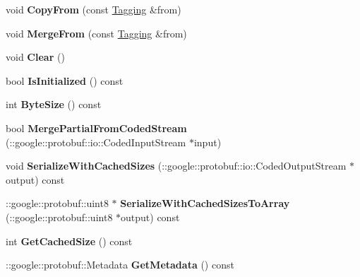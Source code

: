 \begin{DoxyCompactItemize}
\item 
\hypertarget{classTagging_ab2271da80aa840cfa9b2de493b3eeb1f}{
void {\bfseries CopyFrom} (const \hyperlink{classTagging}{Tagging} \&from)}
\label{classTagging_ab2271da80aa840cfa9b2de493b3eeb1f}

\item 
\hypertarget{classTagging_a13d8b75c40ac5f295bc61a2f3f94c3b0}{
void {\bfseries MergeFrom} (const \hyperlink{classTagging}{Tagging} \&from)}
\label{classTagging_a13d8b75c40ac5f295bc61a2f3f94c3b0}

\item 
\hypertarget{classTagging_a43f8e265b50703f56a295083d3aa9676}{
void {\bfseries Clear} ()}
\label{classTagging_a43f8e265b50703f56a295083d3aa9676}

\item 
\hypertarget{classTagging_ab5617848ff03416f1ab4d98e2bfdef26}{
bool {\bfseries IsInitialized} () const }
\label{classTagging_ab5617848ff03416f1ab4d98e2bfdef26}

\item 
\hypertarget{classTagging_a6c2f74cb255bb4913fd279c6f3254729}{
int {\bfseries ByteSize} () const }
\label{classTagging_a6c2f74cb255bb4913fd279c6f3254729}

\item 
\hypertarget{classTagging_a1c8cf78b674f62c201f31e2b6ad721f2}{
bool {\bfseries MergePartialFromCodedStream} (::google::protobuf::io::CodedInputStream $\ast$input)}
\label{classTagging_a1c8cf78b674f62c201f31e2b6ad721f2}

\item 
\hypertarget{classTagging_afbd4d173621ed8cfc227dbcceec933d6}{
void {\bfseries SerializeWithCachedSizes} (::google::protobuf::io::CodedOutputStream $\ast$output) const }
\label{classTagging_afbd4d173621ed8cfc227dbcceec933d6}

\item 
\hypertarget{classTagging_a630b01cebe4512cd199ce76f0e589ca0}{
::google::protobuf::uint8 $\ast$ {\bfseries SerializeWithCachedSizesToArray} (::google::protobuf::uint8 $\ast$output) const }
\label{classTagging_a630b01cebe4512cd199ce76f0e589ca0}

\item 
\hypertarget{classTagging_a4661d58542895ed97b5e55ffb7d19f0c}{
int {\bfseries GetCachedSize} () const }
\label{classTagging_a4661d58542895ed97b5e55ffb7d19f0c}

\item 
\hypertarget{classTagging_a9a38b3cc76fbcae7c96920db44225559}{
::google::protobuf::Metadata {\bfseries GetMetadata} () const }
\label{classTagging_a9a38b3cc76fbcae7c96920db44225559}


\end{DoxyCompactItemize}
